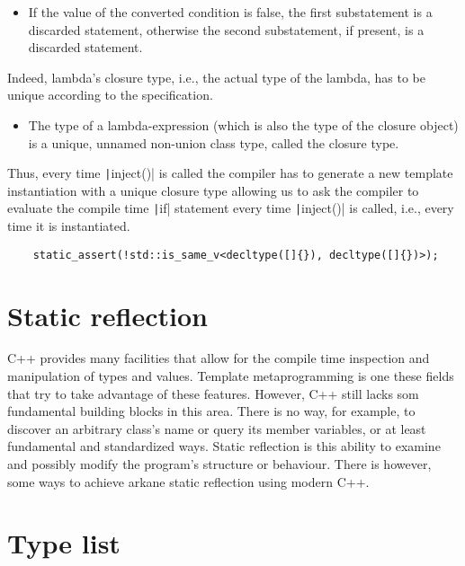 	\begin{itemize}
		\item If the value of the converted condition is false, the first substatement is a discarded statement, otherwise the second substatement, if present, is a discarded statement.
	\end{itemize}

	Indeed, lambda's closure type, i.e., the actual type of the lambda, has to be unique according to the specification.

	\begin{itemize}
		\item The type of a lambda-expression (which is also the type of the closure object) is a unique, unnamed non-union class type, called the closure type.
	\end{itemize}

	Thus, every time \texttt|inject()| is called the compiler has to generate a new template instantiation with a unique closure type allowing us to ask the compiler to evaluate the compile time \texttt|if| statement every time \texttt|inject()| is called, i.e., every time it is instantiated.

    \begin{verbatim}
    static_assert(!std::is_same_v<decltype([]{}), decltype([]{})>);
    \end{verbatim}

    \hrulefill

	\section*{Static reflection}

	C++ provides many facilities that allow for the compile time inspection and manipulation of types and values. Template metaprogramming is one these fields that try to take advantage of these features. However, C++ still lacks som fundamental building blocks in this area. There is no way, for example, to discover an arbitrary class's name or query its member variables, or at least fundamental and standardized ways. Static reflection is this ability to examine and possibly modify the program's structure or behaviour. There is however, some ways to achieve arkane static reflection using modern C++.

	\section*{Type list}

